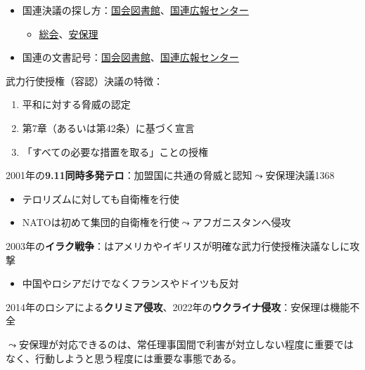 \documentclass[
  xelatex,
  ja=standard]{bxjsarticle}
\providecommand{\tightlist}{%
  \setlength{\itemsep}{0pt}\setlength{\parskip}{0pt}}\usepackage{longtable,booktabs,array}
\begin{document}
\begin{itemize}
\tightlist
\item
  国連決議の探し方：\href{https://rnavi.ndl.go.jp/jp/politics/UN-tool.html}{国会図書館}、\href{https://www.unic.or.jp/texts_audiovisual/libraries/research_guide/}{国連広報センター}

  \begin{itemize}
  \tightlist
  \item
    \href{https://research.un.org/en/docs/ga/quick/regular/76}{総会}、\href{https://www.un.org/securitycouncil/content/resolutions-0}{安保理}
  \end{itemize}
\item
  国連の文書記号：\href{https://rnavi.ndl.go.jp/jp/politics/UN-docOR.html}{国会図書館}、\href{https://www.unic.or.jp/texts_audiovisual/libraries/research_guide/research/symbols/}{国連広報センター}
\end{itemize}

武力行使授権（容認）決議の特徴：

\begin{enumerate}
\def\labelenumi{\arabic{enumi}.}
\tightlist
\item
  平和に対する脅威の認定
\item
  第7章（あるいは第42条）に基づく宣言
\item
  「すべての必要な措置を取る」ことの授権
\end{enumerate}

2001年の\textbf{9.11同時多発テロ}：加盟国に共通の脅威と認知\(\leadsto\)安保理決議1368

\begin{itemize}
\tightlist
\item
  テロリズムに対しても自衛権を行使
\item
  NATOは初めて集団的自衛権を行使\(\leadsto\)アフガニスタンへ侵攻
\end{itemize}

2003年の\textbf{イラク戦争}：はアメリカやイギリスが明確な武力行使授権決議なしに攻撃

\begin{itemize}
\tightlist
\item
  中国やロシアだけでなくフランスやドイツも反対
\end{itemize}

2014年のロシアによる\textbf{クリミア侵攻}、2022年の\textbf{ウクライナ侵攻}：安保理は機能不全

\(\leadsto\)安保理が対応できるのは、常任理事国間で利害が対立しない程度に重要ではなく、行動しようと思う程度には重要な事態である。


  
\end{document}
